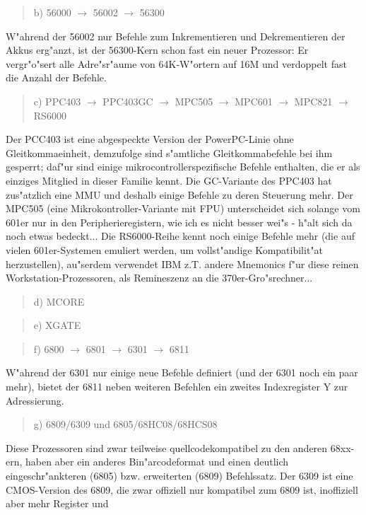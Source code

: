 \documentclass[12pt,a4paper,twoside]{report}
\begin{document}
\begin{quote}
b) 56000 $\longrightarrow$ 56002 $\longrightarrow$ 56300
\end{quote}
W"ahrend der 56002 nur Befehle zum Inkrementieren und Dekrementieren der
Akkus erg"anzt, ist der 56300-Kern schon fast ein neuer Prozessor: Er
vergr"o"sert alle Adre"sr"aume von 64K-W"ortern auf 16M und verdoppelt fast
die Anzahl der Befehle.
\begin{quote}
c) PPC403 $\rightarrow$ PPC403GC $\rightarrow$ MPC505 $\rightarrow$ MPC601 $\rightarrow$ MPC821 $\rightarrow$ RS6000
\end{quote}
Der PCC403 ist eine abgespeckte Version der PowerPC-Linie ohne
Gleitkommaeinheit, demzufolge sind s"amtliche Gleitkommabefehle
bei ihm gesperrt; daf"ur sind einige mikrocontrollerspezifische
Befehle enthalten, die er als einziges Mitglied in dieser Familie
kennt.  Die GC-Variante des PPC403 hat zus"atzlich eine MMU und deshalb
einige Befehle zu deren Steuerung mehr.  Der MPC505 (eine Mikrokontroller-Variante mit FPU)
unterscheidet sich solange vom 601er nur in den Peripherieregistern,
wie ich es nicht besser wei"s - \cite{Mot505} h"alt sich da noch etwas bedeckt...
Die RS6000-Reihe kennt noch einige Befehle mehr (die auf vielen
601er-Systemen emuliert werden, um vollst"andige Kompatibilit"at
herzustellen), au"serdem verwendet IBM z.T. andere Mnemonics f"ur
diese reinen Workstation-Prozessoren, als Remineszenz an die
370er-Gro"srechner...
\begin{quote}
d) MCORE
\end{quote}
\begin{quote}
e) XGATE
\end{quote}
\begin{quote}
f) 6800 $\rightarrow$ 6801 $\rightarrow$ 6301 $\rightarrow$ 6811
\end{quote}
W"ahrend der 6301 nur einige neue Befehle definiert (und der 6301
noch ein paar mehr), bietet der 6811 neben weiteren Befehlen ein
zweites Indexregister Y zur Adressierung.
\begin{quote}
g) 6809/6309 und 6805/68HC08/68HCS08
\end{quote}
Diese Prozessoren sind zwar teilweise quellcodekompatibel zu den
anderen 68xx-ern, haben aber ein anderes Bin"arcodeformat und einen
deutlich eingeschr"ankteren (6805) bzw. erweiterten (6809) Befehlssatz.
Der 6309 ist eine CMOS-Version des 6809, die zwar offiziell
nur kompatibel zum 6809 ist, inoffiziell aber mehr Register und
\end{document}
